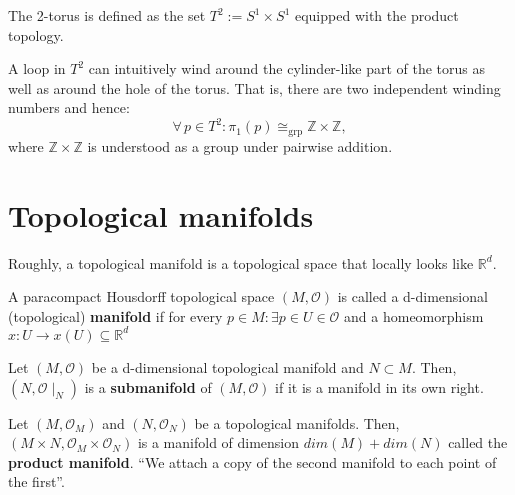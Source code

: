 \documentclass[root.tex]{subfiles}
\begin{document}
\begin{myex}
The 2-torus is defined as the set $T^2:=S^1\times S^1$ equipped with the product topology.
\begin{center}
\end{center}
A loop in $T^2$ can intuitively wind around the cylinder-like part of the torus as well as around the hole of the torus. That is, there are two independent winding numbers and hence:
$$
\forall \, p \in T^2 : \pi_1(p) \cong_\mathrm{grp}\mathbb{Z}\times \mathbb{Z},
$$
where $\mathbb{Z}\times \mathbb{Z}$ is understood as a group under pairwise addition.
\end{myex}

\chapter{Topological manifolds}%
Roughly, a topological manifold is a topological space that locally looks like $\mathbb{R}^d$.
\begin{mydef}
  A paracompact Housdorff topological space $(M, \mathcal{O})$ is called a d-dimensional (topological) \textbf{manifold} if for every $p\in M: \exists p \in U \in \mathcal{O}$ and a homeomorphism $x:U \rightarrow x(U) \subseteq \mathbb{R}^d$
\end{mydef}
\begin{mydef}
  Let $(M,\mathcal{O})$ be a d-dimensional topological manifold and $N \subset M$. Then, $(N,\mathcal{O}\mid_N)$ is a \textbf{submanifold} of $(M,\mathcal{O})$ if it is a manifold in its own right.
\end{mydef}
\begin{mydef}
  Let $(M,\mathcal{O}_M)$ and $(N,\mathcal{O}_N)$ be a topological manifolds. Then, $(M\times N, \mathcal{O}_M \times \mathcal{O}_N)$ is a manifold of dimension $dim(M) + dim(N)$ called the \textbf{product manifold}. ``We attach a copy of the second manifold to each point of the first''.
\end{mydef}
\end{document}
